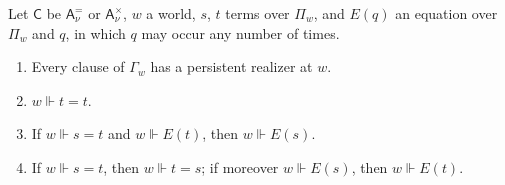 \begin{lemma}
\label{wit:lem:eqb-atomic}
Let $\mathsf{C}$ be $\mathsf{A}^{=}_{\nu}$ or $\mathsf{A}^{\times}_{\nu}$, $w$ a
world, $s$, $t$ terms over $\Pi_w$, and $E(q)$ an equation over $\Pi_w$ and
$q$, in which $q$ may occur any number of times.
\begin{enumerate}[label=\textup{(\roman*)}]
\item Every clause of $\Gamma_w$ has a persistent realizer at $w$.
\item $w\Vdash t=t$.
\item If $w\Vdash s=t$ and $w\Vdash E(t)$, then $w\Vdash E(s)$.
\item If $w\Vdash s=t$, then $w\Vdash t=s$; if moreover $w\Vdash E(s)$, then
 $w\Vdash E(t)$.
\end{enumerate}
\end{lemma}

